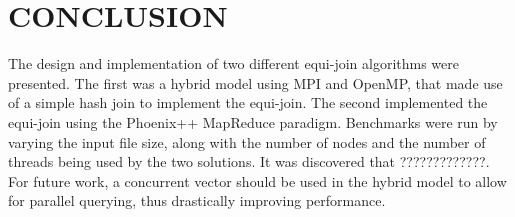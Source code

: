 \documentclass[12pt,twocolumn]{witseiepaper}
\begin{document}
\section{CONCLUSION}
The design and implementation of two different equi-join algorithms were presented. The first was a hybrid model using MPI and OpenMP, that made use of a simple hash join to implement the equi-join. The second implemented the equi-join using the Phoenix++ MapReduce paradigm. Benchmarks were run by varying the input file size, along with the number of nodes and the number of threads being used by the two solutions. It was discovered that ?????????????. For future work, a concurrent vector should be used in the hybrid model to allow for parallel querying, thus drastically improving performance.


{
	{\small

}
}
\end{document}
